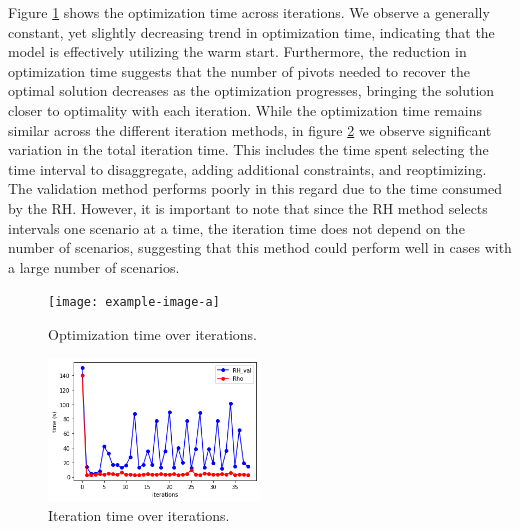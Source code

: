 \documentclass[smallextended,natbib]{svjour3}       %
\numberwithin{theorem}{section}
\begin{document}
Figure \ref{fig:opt_time_over_iter} shows the optimization time across iterations.
 We observe a generally constant, yet slightly decreasing trend in optimization time, indicating that the model is effectively utilizing the warm start. Furthermore, the reduction in optimization time suggests that the number of pivots needed to recover the optimal solution decreases as the optimization progresses, bringing the solution closer to optimality with each iteration.
 While the optimization time remains similar across the different iteration methods, in figure \ref{fig:iter_time_over_iter} we observe significant variation in the total iteration time. This includes the time spent selecting the time interval to disaggregate, adding additional constraints, and reoptimizing. 
 The validation method performs poorly in this regard due to the time consumed by the RH. However, it is important to note that since the RH method selects intervals one scenario at a time, the iteration time does not depend on the number of scenarios, suggesting that this method could perform well in cases with a large number of scenarios.
 

\begin{figure}[H]
  \centering
  \texttt{[image: example-image-a]}%
  \caption{Optimization time over iterations.}
  \label{fig:opt_time_over_iter}
\end{figure}

\begin{figure}[H]
  \centering
  \includegraphics[width=0.5\textwidth]{images/opt_time_rho_vs_val.png}%
  \caption{Iteration time over iterations.}
  \label{fig:iter_time_over_iter}
\end{figure}






\end{document}
